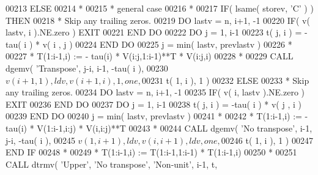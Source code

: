 \begin{DoxyCode}
00213             \textcolor{keywordflow}{ELSE}
00214 \textcolor{comment}{*}
00215 \textcolor{comment}{*              general case}
00216 \textcolor{comment}{*}
00217                \textcolor{keywordflow}{IF}( lsame( storev, \textcolor{stringliteral}{'C'} ) ) \textcolor{keywordflow}{THEN}
00218 \textcolor{comment}{*                 Skip any trailing zeros.}
00219                   \textcolor{keywordflow}{DO} lastv = n, i+1, -1
00220                      \textcolor{keywordflow}{IF}( v( lastv, i ).NE.zero ) \textcolor{keywordflow}{EXIT}
00221 \textcolor{keywordflow}{                  END DO}
00222                   \textcolor{keywordflow}{DO} j = 1, i-1
00223                      t( j, i ) = -tau( i ) * v( i , j )
00224 \textcolor{keywordflow}{                  END DO}   
00225                   j = min( lastv, prevlastv )
00226 \textcolor{comment}{*}
00227 \textcolor{comment}{*                 T(1:i-1,i) := - tau(i) * V(i:j,1:i-1)**T * V(i:j,i)}
00228 \textcolor{comment}{*}
00229                   \textcolor{keyword}{CALL }dgemv( \textcolor{stringliteral}{'Transpose'}, j-i, i-1, -tau( i ), 
00230      $                        v( i+1, 1 ), ldv, v( i+1, i ), 1, one, 
00231      $                        t( 1, i ), 1 )
00232                \textcolor{keywordflow}{ELSE}
00233 \textcolor{comment}{*                 Skip any trailing zeros.}
00234                   \textcolor{keywordflow}{DO} lastv = n, i+1, -1
00235                      \textcolor{keywordflow}{IF}( v( i, lastv ).NE.zero ) \textcolor{keywordflow}{EXIT}
00236 \textcolor{keywordflow}{                  END DO}
00237                   \textcolor{keywordflow}{DO} j = 1, i-1
00238                      t( j, i ) = -tau( i ) * v( j , i )
00239 \textcolor{keywordflow}{                  END DO}   
00240                   j = min( lastv, prevlastv )
00241 \textcolor{comment}{*}
00242 \textcolor{comment}{*                 T(1:i-1,i) := - tau(i) * V(1:i-1,i:j) * V(i,i:j)**T}
00243 \textcolor{comment}{*}
00244                   \textcolor{keyword}{CALL }dgemv( \textcolor{stringliteral}{'No transpose'}, i-1, j-i, -tau( i ),
00245      $                        v( 1, i+1 ), ldv, v( i, i+1 ), ldv, one,
00246      $                        t( 1, i ), 1 )
00247 \textcolor{keywordflow}{               END IF}
00248 \textcolor{comment}{*}
00249 \textcolor{comment}{*              T(1:i-1,i) := T(1:i-1,1:i-1) * T(1:i-1,i)}
00250 \textcolor{comment}{*}
00251                \textcolor{keyword}{CALL }dtrmv( \textcolor{stringliteral}{'Upper'}, \textcolor{stringliteral}{'No transpose'}, \textcolor{stringliteral}{'Non-unit'}, i-1, t,

\end{DoxyCode}
